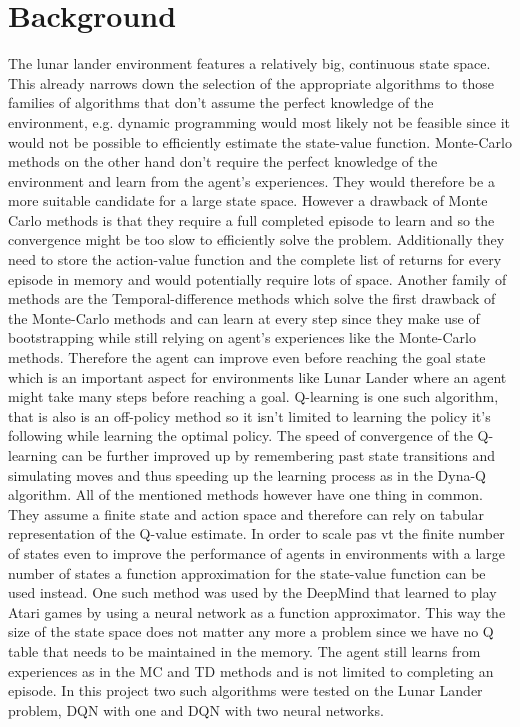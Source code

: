 \documentclass{article}
\begin{document}
\section{Background}
The lunar lander environment features a relatively big, continuous state space. This already narrows down the selection of the appropriate algorithms to those families of algorithms that don't assume the perfect knowledge of the environment, e.g. dynamic programming would most likely not be feasible since it would not be possible to efficiently estimate the state-value function. Monte-Carlo methods on the other hand don't require the perfect knowledge of the environment and learn from the agent's experiences. They would therefore be a more suitable candidate for a large state space. However a drawback of Monte Carlo methods is that they require a full completed episode to learn and so the convergence might be too slow to efficiently solve the problem. Additionally they need to store the action-value function and the complete list of returns for every episode in memory and would potentially require lots of space. Another family of methods are the Temporal-difference methods which solve the first drawback of the Monte-Carlo methods and can learn at every step since they make use of bootstrapping while still relying on agent's experiences like the Monte-Carlo methods. Therefore the agent can improve even before reaching the goal state which is an important aspect for environments like Lunar Lander where an agent might take many steps before reaching a goal. Q-learning is one such algorithm, that is also is an off-policy method so it isn't limited to learning the policy it's following while learning the optimal policy. The speed of convergence of the Q-learning can be further improved up by remembering past state transitions and simulating moves and thus speeding up the learning process as in the Dyna-Q algorithm. All of the mentioned methods however have one thing in common. They assume a finite state and action space and therefore can rely on tabular representation of the Q-value estimate. In order to scale pas vt the finite number of states even to improve the performance of agents in environments with a large number of states a function approximation for the state-value function can be used instead. One such method was used by the DeepMind that learned to play Atari games by using a neural network as a function approximator. This way the size of the state space does not matter any more a problem since we have no Q table that needs to be maintained in the memory. The agent still learns from experiences as in the MC and TD methods and is not limited to completing an episode. In this project two such algorithms were tested on the Lunar Lander problem, DQN with one and DQN with two neural networks.
 
\end{document}
